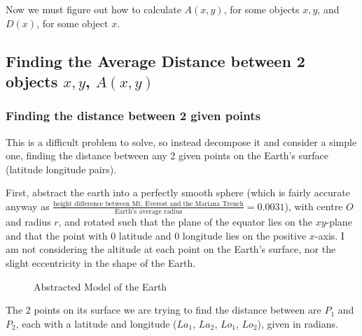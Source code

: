\documentclass[12pt]{report}
\newcommand{\comma}{,}
\begin{document}
Now we must figure out how to calculate $A\left(x,y\right)$, for some objects $x,y$, and $D\left(x\right)$, for some object $x$.

\subsection{Finding the Average Distance between 2 objects $x,y$, $A\left(x\comma{}y\right)$}\label{sec:axy}
\subsubsection{Finding the distance between 2 given points}
This is a difficult problem to solve, so instead decompose it and consider a simple one, finding the distance between any 2 given points on the Earth's surface (latitude longitude pairs).

First, abstract the earth into a perfectly smooth sphere (which is fairly accurate anyway as $\frac{\text{height difference between Mt. Everest and the Mariana Trench}}{\text{Earth's average radius}}=0.0031$), with centre $O$ and radius $r$, and rotated such that the plane of the equator lies on the $xy$-plane and that the point with 0 latitude and 0 longitude lies on the positive $x$-axis. I am not considering the altitude at each point on the Earth's surface, nor the slight eccentricity in the shape of the Earth.
\begin{figure}[H]
\centering
{}
\caption{Abstracted Model of the Earth}\label{fig:abstractedEarth}
\end{figure}

The 2 points on its surface we are trying to find the distance between are $P_1$ and $P_2$, each with a latitude and longitude ($La_1$, $La_2$, $Lo_1$, $Lo_2$), given in radians.
\end{document}
